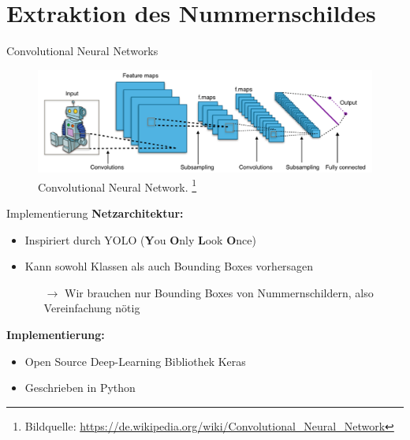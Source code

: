 \section{Extraktion des Nummernschildes}

\begin{frame}{Convolutional Neural Networks}
    \begin{figure}
        \includegraphics[width=\textwidth]{bilder/Typical_cnn.png}
        \caption{Convolutional Neural Network.
            \footnote{Bildquelle: \url{https://de.wikipedia.org/wiki/Convolutional_Neural_Network}}}
    \end{figure}
    \begin{center}
    \end{center}
\end{frame}

\begin{frame}{Implementierung}
    \textbf{Netzarchitektur:}
    \begin{itemize}
        \item Inspiriert durch YOLO (\textbf{Y}ou \textbf{O}nly \textbf{L}ook \textbf{O}nce) \cite{yolov3}
        \item Kann sowohl Klassen als auch Bounding Boxes vorhersagen
        \begin{itemize}
            \item[$\rightarrow$] Wir brauchen nur Bounding Boxes von Nummernschildern, also Vereinfachung n\"otig
        \end{itemize}
    \end{itemize}
    \textbf{Implementierung:}
    \begin{itemize}
        \item Open Source Deep-Learning Bibliothek Keras
        \item Geschrieben in Python
    \end{itemize}
\end{frame}